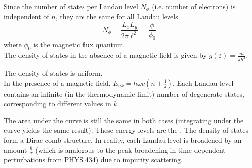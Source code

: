 \documentclass[12pt,a4paper,titlepage]{article}
\newcommand{\ul}[1]{\underline{\smash{#1}}} %
\begin{document}
Since the number of states per Landau level $N_{\phi}$ (i.e. number of electrons) is independent of $n$, they are the same for all Landau levels.
\begin{equation}
N_{\phi}=\frac{L_{x}L_{y}}{2\pi\ell^{2}}=\frac{\phi}{\phi_{0}}
\end{equation}
where $\phi_{0}$ is the magnetic flux quantum.\\

The density of states in the absence of a magnetic field is given by $g(\varepsilon)=\frac{m}{\pi\hbar^{2}}$.
\begin{center}
\end{center}
The density of states is uniform.\\

In the presence of a magnetic field, $E_{nk}=\hbar\omega{c}\left(n+\frac{1}{2}\right)$. Each Landau level contains an infinite (in the thermodynamic limit) number of degenerate states, corresponding to different values in $k$.
\begin{center}
\end{center}

The area under the curve is still the same in both cases (integrating under the curve yields the same result). These energy levels are the \ul{Landau levels}. The density of states form a Dirac comb structure. In reality, each Landau level is broadened by an amount $\frac{\hbar}{\tau}$ (which is analogous to the peak broadening in time-dependent perturbations from PHYS 434) due to impurity scattering.\\
\end{document}
